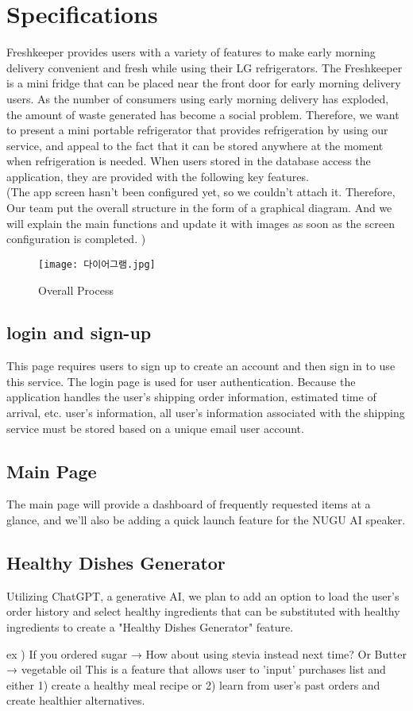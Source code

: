 \documentclass[conference]{IEEEtran}
\begin{document}
\section{Specifications}
Freshkeeper provides users with a variety of features to make early morning delivery convenient and fresh while using their LG refrigerators. The Freshkeeper is a mini fridge that can be placed near the front door for early morning delivery users. As the number of consumers using early morning delivery has exploded, the amount of waste generated has become a social problem. Therefore, we want to present a mini portable refrigerator that provides refrigeration by using our service, and appeal to the fact that it can be stored anywhere at the moment when refrigeration is needed. 
When users stored in the database access the application, they are provided with the following key features. \\
(The app screen hasn't been configured yet, so we couldn't attach it. Therefore, Our team put the overall structure in the form of a graphical diagram. And we will explain the main functions and update it with images as soon as the screen configuration is completed. )
\begin{figure}[htbp]
\centerline{\texttt{[image: 다이어그램.jpg]}}
\caption{Overall Process}
\label{fig}
\end{figure}

\subsection{login and sign-up}
This page requires users to sign up to create an account and then sign in to use this service. The login page is used for user authentication. Because the application handles the user's shipping order information, estimated time of arrival, etc.
user's information, all user's information associated with the shipping service must be stored based on a unique email user account.

\subsection{Main Page}
The main page will provide a dashboard of frequently requested items at a glance, and we'll also be adding a quick launch feature for the NUGU AI speaker.

\subsection{Healthy Dishes Generator}
Utilizing ChatGPT, a generative AI, we plan to add an option to load the user's order history and select healthy ingredients that can be substituted with healthy ingredients to create a "Healthy Dishes Generator" feature. \par
 ex ) If you ordered sugar → How about using stevia instead next time? Or Butter → vegetable oil 
This is a feature that allows user to 'input' purchases list and either 1) create a healthy meal recipe or 2) learn from user's past orders and create healthier alternatives. 
\end{document}
